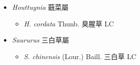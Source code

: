 
  \begin{itemize}
 \item[] \textit{Houttuynia} 蕺菜屬
                                
  \begin{itemize}
        \item[] \textit{H. cordata} Thunb.  臭腥草   LC
  \end{itemize}
 \item[] \textit{Saururus} 三白草屬
                                
  \begin{itemize}
        \item[] \textit{S. chinensis} (Lour.) Baill.  三白草   LC
  \end{itemize}
  \end{itemize}
